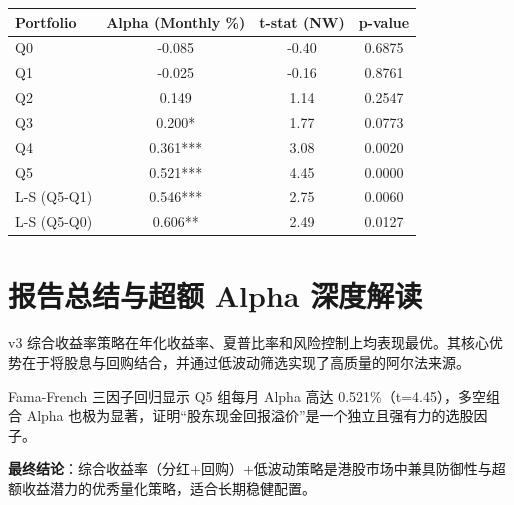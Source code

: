 \documentclass[10pt,a4paper]{ctexart}
\begin{document}
\begin{table}[htbp]
\centering
\begin{tabular}{lccc}
\toprule
Portfolio & Alpha (Monthly \%) & t-stat (NW) & p-value \\
\midrule
Q0          & -0.085  & -0.40 & 0.6875 \\
Q1          & -0.025  & -0.16 & 0.8761 \\
Q2          & 0.149   & 1.14  & 0.2547 \\
Q3          & 0.200*  & 1.77  & 0.0773 \\
Q4          & 0.361*** & 3.08 & 0.0020 \\
Q5          & 0.521*** & 4.45 & 0.0000 \\
L-S (Q5-Q1) & 0.546*** & 2.75 & 0.0060 \\
L-S (Q5-Q0) & 0.606**  & 2.49 & 0.0127 \\
\bottomrule
\end{tabular}
\end{table}

\section{报告总结与超额 Alpha 深度解读}

v3 综合收益率策略在年化收益率、夏普比率和风险控制上均表现最优。其核心优势在于将股息与回购结合，并通过低波动筛选实现了高质量的阿尔法来源。

Fama-French 三因子回归显示 Q5 组每月 Alpha 高达 0.521\%（t=4.45），多空组合 Alpha 也极为显著，证明“股东现金回报溢价”是一个独立且强有力的选股因子。

\textbf{最终结论}：综合收益率（分红+回购）+低波动策略是港股市场中兼具防御性与超额收益潜力的优秀量化策略，适合长期稳健配置。
\end{document}
